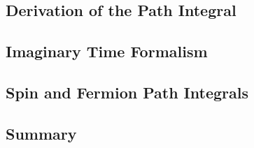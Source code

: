 \subsection{Derivation of the Path Integral}

\subsection{Imaginary Time Formalism}

\subsection{Spin and Fermion Path Integrals}

\subsection{Summary}
